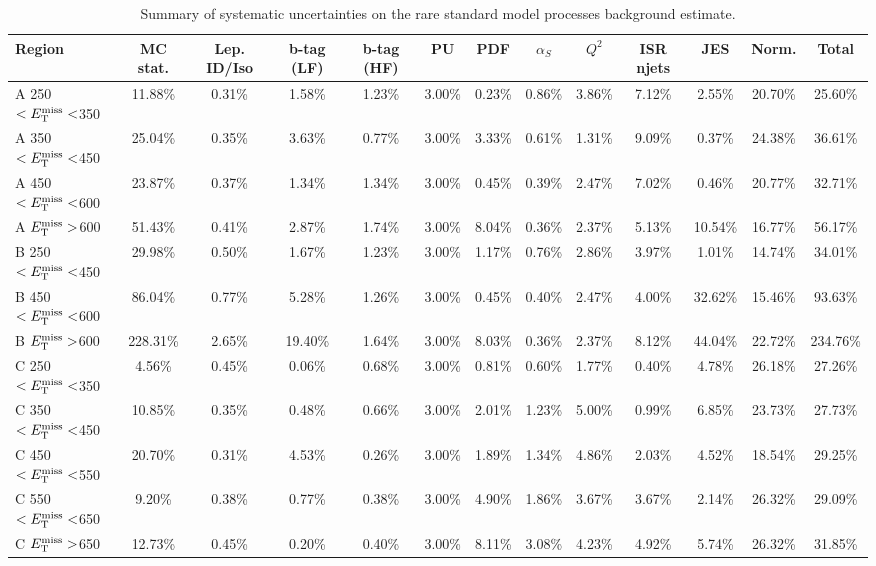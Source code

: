 \begin{table}
\centering
\footnotesize
\caption{Summary of systematic uncertainties on the rare standard
  model processes background estimate.}
\label{tab:stop:rarebkg:systematics}
\begin{tabular}{|l|cccccccccccc|}
\hline
Region & MC stat.   &   Lep. ID/Iso   &   b-tag (LF) &   b-tag (HF)  &   PU &   PDF &   $\alpha_S$ &   $Q^2$ &   ISR njets  & JES &   Norm.  & Total \\
\hline
 A 250$<E_\text{T}^\text{miss}<$350 & 11.88\% & 0.31\%  & 1.58\%  & 1.23\%  & 3.00\%  & 0.23\%  & 0.86\%  & 3.86\%  & 7.12\%  & 2.55\%  & 20.70\% & 25.60\% \\
 A 350$<E_\text{T}^\text{miss}<$450 & 25.04\% & 0.35\%  & 3.63\%  & 0.77\%  & 3.00\%  & 3.33\%  & 0.61\%  & 1.31\%  & 9.09\%  & 0.37\%  & 24.38\% & 36.61\% \\
 A 450$<E_\text{T}^\text{miss}<$600 & 23.87\% & 0.37\%  & 1.34\%  & 1.34\%  & 3.00\%  & 0.45\%  & 0.39\%  & 2.47\%  & 7.02\%  & 0.46\%  & 20.77\% & 32.71\% \\
 A $E_\text{T}^\text{miss}>$600     & 51.43\% & 0.41\%  & 2.87\%  & 1.74\%  & 3.00\%  & 8.04\%  & 0.36\%  & 2.37\%  & 5.13\%  & 10.54\% & 16.77\% & 56.17\% \\
 B 250$<E_\text{T}^\text{miss}<$450 & 29.98\% & 0.50\%  & 1.67\%  & 1.23\%  & 3.00\%  & 1.17\%  & 0.76\%  & 2.86\%  & 3.97\%  & 1.01\%  & 14.74\% & 34.01\% \\
 B 450$<E_\text{T}^\text{miss}<$600 & 86.04\% & 0.77\%  & 5.28\%  & 1.26\%  & 3.00\%  & 0.45\%  & 0.40\%  & 2.47\%  & 4.00\%  & 32.62\% & 15.46\% & 93.63\% \\
 B $E_\text{T}^\text{miss}>$600     & 228.31\%& 2.65\%  & 19.40\% & 1.64\%  & 3.00\%  & 8.03\%  & 0.36\%  & 2.37\%  & 8.12\%  & 44.04\% & 22.72\% & 234.76\%\\
 C 250$<E_\text{T}^\text{miss}<$350 & 4.56\%  & 0.45\%  & 0.06\%  & 0.68\%  & 3.00\%  & 0.81\%  & 0.60\%  & 1.77\%  & 0.40\%  & 4.78\%  & 26.18\% & 27.26\% \\
 C 350$<E_\text{T}^\text{miss}<$450 & 10.85\% & 0.35\%  & 0.48\%  & 0.66\%  & 3.00\%  & 2.01\%  & 1.23\%  & 5.00\%  & 0.99\%  & 6.85\%  & 23.73\% & 27.73\% \\
 C 450$<E_\text{T}^\text{miss}<$550 & 20.70\% & 0.31\%  & 4.53\%  & 0.26\%  & 3.00\%  & 1.89\%  & 1.34\%  & 4.86\%  & 2.03\%  & 4.52\%  & 18.54\% & 29.25\% \\
 C 550$<E_\text{T}^\text{miss}<$650 & 9.20\%  & 0.38\%  & 0.77\%  & 0.38\%  & 3.00\%  & 4.90\%  & 1.86\%  & 3.67\%  & 3.67\%  & 2.14\%  & 26.32\% & 29.09\% \\
 C $E_\text{T}^\text{miss}>$650     & 12.73\% & 0.45\%  & 0.20\%  & 0.40\%  & 3.00\%  & 8.11\%  & 3.08\%  & 4.23\%  & 4.92\%  & 5.74\%  & 26.32\% & 31.85\% \\

\end{tabular}
\end{table}
